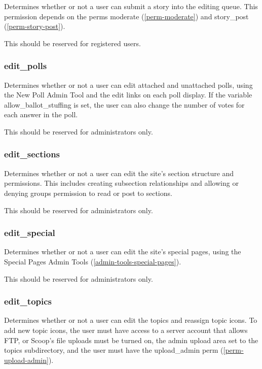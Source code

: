 Determines whether or not a user can submit a story into the editing queue.  This permission depends on the perms moderate (\ref{perm-moderate}) and story\_post (\ref{perm-story-post}).

This should be reserved for registered users.

\subsubsection{edit\_polls}
\label{perm-edit-polls}

Determines whether or not a user can edit attached and unattached polls, using the New Poll Admin Tool and the edit links on each poll display.  If the variable allow\_ballot\_stuffing is set, the user can also change the number of votes for each answer in the poll.

This should be reserved for administrators only.

\subsubsection{edit\_sections}
\label{perm-edit-sections}

Determines whether or not a user can edit the site's section structure and permissions.  This includes creating subsection relationships and allowing or denying groups permission to read or post to sections.

This should be reserved for administrators only.

\subsubsection{edit\_special}
\label{perm-edit-special}

Determines whether or not a user can edit the site's special pages, using the Special Pages Admin Tools (\ref{admin-tools-special-pages}).

This should be reserved for administrators only.

\subsubsection{edit\_topics}
\label{perm-edit-topics}

Determines whether or not a user can edit the topics and reassign topic icons.  To add new topic icons, the user must have access to a server account that allows FTP, or Scoop's file uploads must be turned on, the admin upload area set to the topics subdirectory, and the user must have the upload\_admin perm (\ref{perm-upload-admin}).

